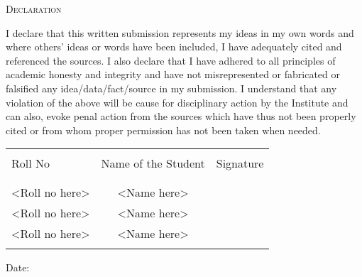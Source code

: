 \newpage

\begin{center}
    \Large \textsc {Declaration}\\[0.5cm]
\end{center}

I declare that this written submission represents my ideas in my own words and
where others' ideas or words have been included, I have adequately cited and
referenced the sources. I also declare that I have adhered to all principles
of academic honesty and integrity and have not misrepresented or fabricated or
falsified any idea/data/fact/source in my submission. I understand that any
violation of the above will be cause for disciplinary action by the Institute and can
also, evoke penal action from the sources which have thus not been properly cited
or from whom proper permission has not been taken when needed.\\[0.5cm]

\begin{table}[h]
    \centering
    \begin{tabular}{lcr}\hline                                      \\
        Roll No        & Name of the Student & Signature \\
        \\ \hline
        \\
        <Roll no here> & <Name here>         &           \\
        <Roll no here> & <Name here>         &           \\
        <Roll no here> & <Name here>         &           \\
        \\ \hline
    \end{tabular}
\end{table}

\vspace{1.5cm}

\begin{flushleft}
    Date:
\end{flushleft}
